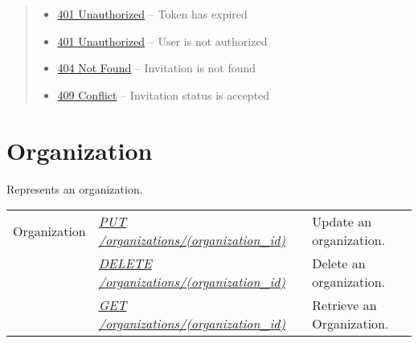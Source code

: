 \documentclass[letterpaper,10pt,english]{sphinxmanual}
\begin{document}
\begin{fulllineitems}
\begin{quote}
\begin{description}
\begin{itemize}
\item {} 
\href{http://www.w3.org/Protocols/rfc2616/rfc2616-sec10.html\#sec10.4.2}{401 Unauthorized} -- Token has expired

\item {} 
\href{http://www.w3.org/Protocols/rfc2616/rfc2616-sec10.html\#sec10.4.2}{401 Unauthorized} -- User is not authorized

\item {} 
\href{http://www.w3.org/Protocols/rfc2616/rfc2616-sec10.html\#sec10.4.5}{404 Not Found} -- Invitation is not found

\item {} 
\href{http://www.w3.org/Protocols/rfc2616/rfc2616-sec10.html\#sec10.4.10}{409 Conflict} -- Invitation status is accepted

\end{itemize}

\end{description}\end{quote}

\end{fulllineitems}



\section{Organization}
\label{\detokenize{resources/organization::doc}}\label{\detokenize{resources/organization:organization}}\label{\detokenize{resources/organization:id1}}
Represents an organization.

\noindent\begin{tabulary}{\linewidth}{|L|L|L|}
\hline
{}\relax &\relax &\relax \\
\hline
Organization
&
{\hyperref[\detokenize{resources/organization:put--organizations-(organization_id)}]{\emph{PUT /organizations/(organization\_id)}}}
&
Update an organization.
\\
\hline&
{\hyperref[\detokenize{resources/organization:delete--organizations-(organization_id)}]{\emph{DELETE /organizations/(organization\_id)}}}
&
Delete an organization.
\\
\hline&
{\hyperref[\detokenize{resources/organization:get--organizations-(organization_id)}]{\emph{GET /organizations/(organization\_id)}}}
&
Retrieve an Organization.
\\
\hline\end{tabulary}
\end{document}
